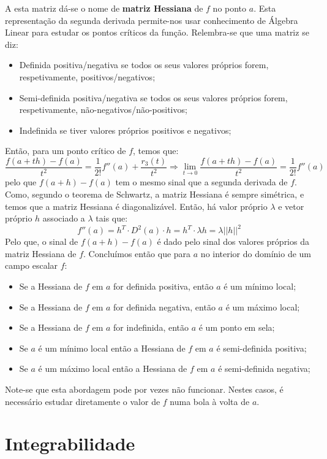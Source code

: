 \documentclass{article}
\begin{document}
A esta matriz dá-se o nome de \textbf{matriz Hessiana} de $f$ no ponto $a$. Esta representação da segunda derivada permite-nos usar conhecimento de Álgebra Linear para estudar os pontos críticos da função. Relembra-se que uma matriz se diz:
\begin{itemize}
	\item Definida positiva/negativa se todos os seus valores próprios forem, respetivamente, positivos/negativos;
	\item Semi-definida positiva/negativa se todos os seus valores próprios forem, respetivamente, não-negativos/não-positivos;
	\item Indefinida se tiver valores próprios positivos e negativos;
\end{itemize}
Então, para um ponto crítico de $f$, temos que:
$$
\frac{f(a+th)-f(a)}{t^2} = \frac{1}{2!}f''(a) + \frac{r_3(t)}{t^2} \Rightarrow \lim_{t \to 0} \frac{f(a+th)-f(a)}{t^2} = \frac{1}{2!}f''(a)
$$
pelo que $f(a+h)-f(a)$ tem o mesmo sinal que a segunda derivada de $f$. Como, segundo o teorema de Schwartz, a matriz Hessiana é sempre simétrica, e temos que a matriz Hessiana é diagonalizável. Então, há valor próprio $\lambda$ e vetor próprio $h$ associado a $\lambda$ tais que:
$$
f''(a) = h^T \cdot D^2 (a) \cdot h = h^T \cdot \lambda h = \lambda ||h||^2
$$
Pelo que, o sinal de $f(a+h)-f(a)$ é dado pelo sinal dos valores próprios da matriz Hessiana de $f$. Concluímos então que para $a$ no interior do domínio de um campo escalar $f$:
\begin{itemize}
	\item Se a Hessiana de $f$ em $a$ for definida positiva, então $a$ é um mínimo local;
	\item Se a Hessiana de $f$ em $a$ for definida negativa, então $a$ é um máximo local;
	\item Se a Hessiana de $f$ em $a$ for indefinida, então $a$ é um ponto em sela;
	\item Se $a$ é um mínimo local então a Hessiana de $f$ em $a$ é semi-definida positiva;
	\item Se $a$ é um máximo local então a Hessiana de $f$ em $a$ é semi-definida negativa;
\end{itemize}
Note-se que esta abordagem pode por vezes não funcionar. Nestes casos, é necessário estudar diretamente o valor de $f$ numa bola à volta de $a$.

\section{Integrabilidade}
\end{document}
